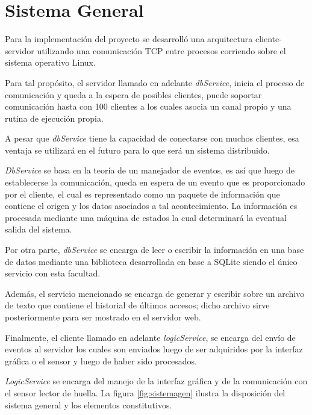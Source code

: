 \section{Sistema General}
Para la implementación del proyecto se desarrolló una arquitectura cliente-servidor utilizando una comunicación TCP entre procesos corriendo sobre el sistema operativo Linux.

Para tal propósito, el servidor llamado en adelante \textit{dbService}, inicia el proceso de comunicación y queda a la espera de posibles clientes, puede soportar comunicación hasta con 100 clientes a los cuales asocia un canal propio y una rutina de ejecución propia.

A pesar que \textit{dbService} tiene la capacidad de conectarse con muchos clientes, esa ventaja se utilizará en el futuro para lo que será un sistema distribuido.

\textit{DbService} se basa en la teoría de un manejador de eventos, es así que luego de establecerse la comunicación, queda en espera de un evento que es proporcionado por el cliente, el cual es representado como un paquete de información que contiene el origen y los datos asociados a tal acontecimiento. La información es procesada mediante una máquina de estados la cual determinará la eventual salida del sistema.

Por otra parte, \textit{dbService} se encarga de leer o escribir la información en una base de datos mediante una biblioteca desarrollada en base a SQLite siendo el único servicio con esta facultad.

Además, el servicio mencionado se encarga de generar y escribir sobre un archivo de texto que contiene el historial de últimos accesos; dicho archivo sirve posteriormente para ser mostrado en el servidor web.

Finalmente, el cliente llamado en adelante \textit{logicService}, se encarga del envío de eventos al servidor los cuales son enviados luego de ser adquiridos por la interfaz gráfica o el sensor y luego de haber sido procesados.

\textit{LogicService} se encarga del manejo de la interfaz gráfica y de la comunicación con el sensor lector de huella.
La figura \ref{fig:sistemagen} ilustra la disposición del sistema general y los elementos constitutivos.

